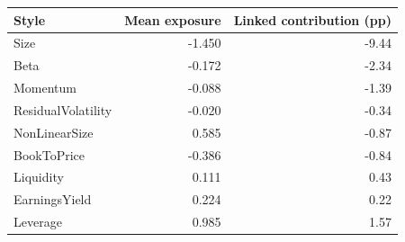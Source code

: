 \begin{tabular}{lrr}
\toprule
Style & Mean exposure & Linked contribution (pp) \\
\midrule
Size & -1.450 & -9.44 \\
Beta & -0.172 & -2.34 \\
Momentum & -0.088 & -1.39 \\
ResidualVolatility & -0.020 & -0.34 \\
NonLinearSize & 0.585 & -0.87 \\
BookToPrice & -0.386 & -0.84 \\
Liquidity & 0.111 & 0.43 \\
EarningsYield & 0.224 & 0.22 \\
Leverage & 0.985 & 1.57 \\
\bottomrule
\end{tabular}
